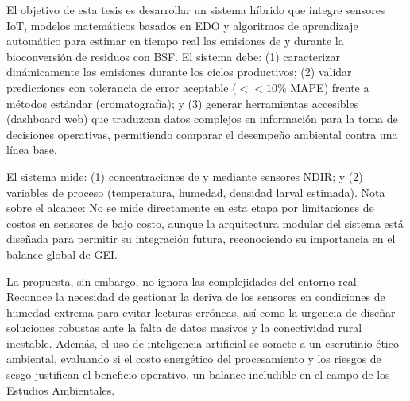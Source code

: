 El objetivo de esta tesis es desarrollar un sistema híbrido que integre sensores IoT, modelos matemáticos basados en EDO y algoritmos de aprendizaje automático para estimar en tiempo real las emisiones de  y  durante la bioconversión de residuos con BSF. El sistema debe: (1) caracterizar dinámicamente las emisiones durante los ciclos productivos; (2) validar predicciones con tolerancia de error aceptable ($<<10\%$ MAPE) frente a métodos estándar (cromatografía); y (3) generar herramientas accesibles (dashboard web) que traduzcan datos complejos en información para la toma de decisiones operativas, permitiendo comparar el desempeño ambiental contra una línea base.

El sistema mide: (1) concentraciones de  y  mediante sensores NDIR; y (2) variables de proceso (temperatura, humedad, densidad larval estimada). Nota sobre el alcance: No se mide directamente  en esta etapa por limitaciones de costos en sensores de bajo costo, aunque la arquitectura modular del sistema está diseñada para permitir su integración futura, reconociendo su importancia en el balance global de GEI.

La propuesta, sin embargo, no ignora las complejidades del entorno real. Reconoce la necesidad de gestionar la deriva de los sensores en condiciones de humedad extrema para evitar lecturas erróneas, así como la urgencia de diseñar soluciones robustas ante la falta de datos masivos y la conectividad rural inestable. Además, el uso de inteligencia artificial se somete a un escrutinio ético-ambiental, evaluando si el costo energético del procesamiento y los riesgos de sesgo justifican el beneficio operativo, un balance ineludible en el campo de los Estudios Ambientales.
